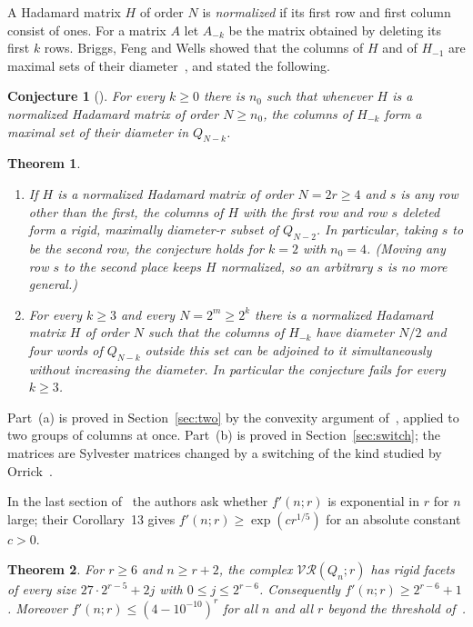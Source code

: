 \documentclass[11pt]{amsart}
\newtheorem{theorem}{Theorem}[section]
\newtheorem*{conjecture*}{Conjecture}
\theoremstyle{remark}
\newcommand{\VR}{\mathcal{VR}}
\begin{document}
A Hadamard matrix $H$ of order $N$ is \emph{normalized} if its first row and first column consist of ones. For a matrix
$A$ let $A_{-k}$ be the matrix obtained by deleting its first $k$ rows. Briggs, Feng and Wells showed that the columns of
$H$ and of $H_{-1}$ are maximal sets of their diameter~\cite[Theorem~4 and Corollary~6]{BFW}, and stated the following.

\begin{conjecture*}[{\cite[Conjecture~3]{BFW}}]
For every $k\ge0$ there is $n_0$ such that whenever $H$ is a normalized Hadamard matrix of order $N\ge n_0$, the
columns of $H_{-k}$ form a maximal set of their diameter in $Q_{N-k}$.
\end{conjecture*}

\begin{theorem}\label{thm:cutoff}
\begin{enumerate}
\item[(a)] If $H$ is a normalized Hadamard matrix of order $N=2r\ge4$ and $s$ is any row other than the first, the
columns of $H$ with the first row and row $s$ deleted form a rigid, maximally diameter-$r$ subset of $Q_{N-2}$. In
particular, taking $s$ to be the second row, the conjecture holds for $k=2$ with $n_0=4$. (Moving any row $s$ to the
second place keeps $H$ normalized, so an arbitrary $s$ is no more general.)
\item[(b)] For every $k\ge3$ and every $N=2^m\ge2^k$ there is a normalized Hadamard matrix $H$ of order $N$ such that
the columns of $H_{-k}$ have diameter $N/2$ and four words of $Q_{N-k}$ outside this set can be adjoined to it
simultaneously without increasing the diameter. In particular the conjecture fails for every $k\ge3$.
\end{enumerate}
\end{theorem}

Part~(a) is proved in Section~\ref{sec:two} by the convexity argument of~\cite[Theorem~4]{BFW}, applied to two groups of
columns at once. Part~(b) is proved in Section~\ref{sec:switch}; the matrices are Sylvester matrices changed by a
switching of the kind studied by Orrick~\cite{Orr}.

In the last section of~\cite{BFW} the authors ask whether $f'(n;r)$ is exponential in $r$ for $n$ large; their
Corollary~13 gives $f'(n;r)\ge\exp(cr^{1/5})$ for an absolute constant $c>0$.

\begin{theorem}\label{thm:dims}
For $r\ge6$ and $n\ge r+2$, the complex $\VR(Q_n;r)$ has rigid facets of every size $27\cdot2^{r-5}+2j$ with
$0\le j\le 2^{r-6}$. Consequently $f'(n;r)\ge 2^{r-6}+1$. Moreover $f'(n;r)\le(4-10^{-10})^r$ for all $n$ and all
$r$ beyond the threshold of~\cite[Theorem~3]{BS}.
\end{theorem}
\end{document}
